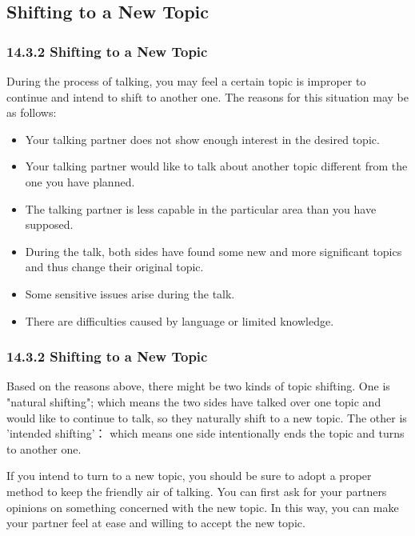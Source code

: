 \documentclass[aspectratio=169,UTF8,c]{beamer}%
\begin{document}
\subsection{Shifting to a New Topic}
\begin{frame}
	\frametitle{14.3.2 Shifting to a New Topic}
	During the process of talking, you may feel a certain topic is improper to continue and intend to shift to another one. The reasons for this situation may be as follows:
	
	\begin{itemize}
		\item Your talking partner does not show enough interest in the desired topic.
		\item Your talking partner would like to talk about another topic different from the one you have planned.
		\item The talking partner is less capable in the particular area than you have supposed.
		\item During the talk, both sides have found some new and more significant topics and thus change their original topic.
		\item Some sensitive issues arise during the talk.
		\item There are difficulties caused by language or limited knowledge.
	\end{itemize}
\end{frame}
\begin{frame}
	\frametitle{14.3.2 Shifting to a New Topic}
	Based on the reasons above, there might be two kinds of topic shifting. One is "natural shifting"; which means the two sides have talked over one topic and would like to continue to talk, so they naturally shift to a new topic. The other is 'intended shifting'： which means one side intentionally ends the topic and turns to another one. 
	
	If you intend to turn to a new topic, you should be sure to adopt a proper method to keep the friendly air of talking. You can first ask for your partners opinions on something concerned with the new topic. In this way, you can make your partner feel at ease and willing to accept the new topic. 
\end{frame}
\end{document}
